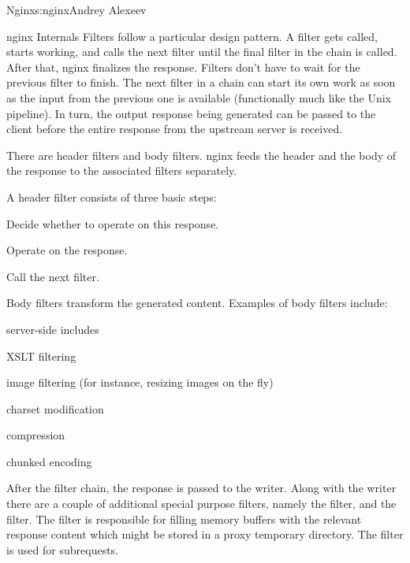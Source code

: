 \begin{aosachapter}{Nginx}{s:nginx}{Andrey Alexeev}
\begin{aosasect1}{nginx Internals}
Filters follow a particular design pattern. A filter gets called,
starts working, and calls the next filter until the final filter in
the chain is called. After that, nginx finalizes the response. Filters
don't have to wait for the previous filter to finish. The next filter
in a chain can start its own work as soon as the input from the
previous one is available (functionally much like the Unix
pipeline). In turn, the output response being generated can be passed
to the client before the entire response from the upstream server is
received.

There are header filters and body filters. nginx feeds the header and
the body of the response to the associated filters separately.

A header filter consists of three basic steps:

\begin{aosaenumerate}

\item Decide whether to operate on this response.

\item Operate on the response.

\item Call the next filter.

\end{aosaenumerate}

Body filters transform the generated content. Examples of body filters
include:

\begin{aosaitemize}

\item server-side includes

\item XSLT filtering

\item image filtering (for instance, resizing images on the fly)

\item charset modification

\item {} compression

\item chunked encoding

\end{aosaitemize}

After the filter chain, the response is passed to the writer. Along
with the writer there are a couple of additional special purpose
filters, namely the  filter, and the 
filter. The  filter is responsible for filling memory
buffers with the relevant response content which might be stored in a
proxy temporary directory. The  filter is used for
subrequests.


\end{aosasect1}
\end{aosachapter}

